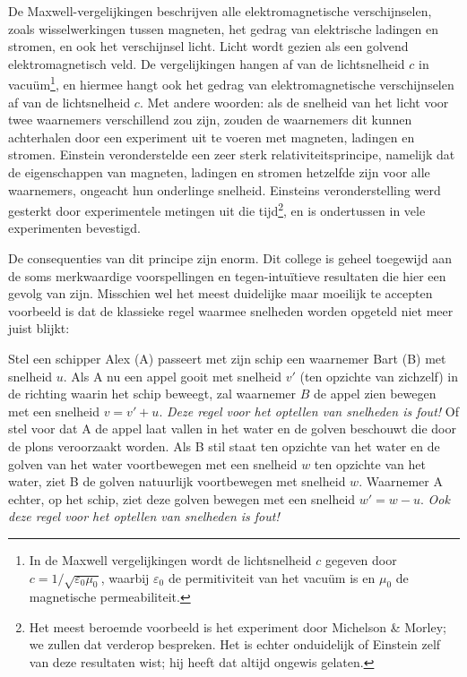 De Maxwell-vergelijkingen beschrijven alle elektromagnetische
verschijnselen, zoals wisselwerkingen tussen magneten, het gedrag van
elektrische ladingen en stromen, en ook het verschijnsel licht. Licht
wordt gezien als een golvend elektromagnetisch veld. De vergelijkingen
hangen af van de lichtsnelheid $c$ in vacu\"um\footnote{In de Maxwell
vergelijkingen wordt de lichtsnelheid $c$ gegeven door
$c=1/\sqrt{\varepsilon_0 \mu_0}$, waarbij $\varepsilon_0$ de
permitiviteit van het vacu\"um is en $\mu_0$ de magnetische
permeabiliteit.}, en hiermee hangt ook het gedrag van
elektromagnetische verschijnselen af van de lichtsnelheid $c$. Met
andere woorden: als de snelheid van het licht voor twee waarnemers
verschillend zou zijn, zouden de waarnemers dit kunnen achterhalen
door een experiment uit te voeren met magneten, ladingen en
stromen. Einstein veronderstelde een zeer sterk relativiteitsprincipe,
namelijk dat de eigenschappen van magneten, ladingen en stromen
hetzelfde zijn voor alle waarnemers, ongeacht hun onderlinge
snelheid. Einsteins veronderstelling werd gesterkt door experimentele
metingen uit die tijd\footnote{Het meest beroemde voorbeeld is het
experiment door Michelson \& Morley; we zullen dat verderop
bespreken. Het is echter onduidelijk of Einstein zelf van deze
resultaten wist; hij heeft dat altijd ongewis gelaten.}, en is
ondertussen in vele experimenten bevestigd.

De consequenties van dit principe zijn enorm. Dit college is geheel
toegewijd aan de soms merkwaardige voorspellingen en
tegen-intu\"itieve resultaten die hier een gevolg van zijn. Misschien
wel het meest duidelijke maar moeilijk te accepten voorbeeld is dat de
klassieke regel waarmee snelheden worden opgeteld niet meer juist
blijkt:

Stel een schipper Alex (A) passeert met zijn schip een waarnemer Bart
(B) met snelheid $u$. Als A nu een appel gooit met snelheid $v'$ (ten
opzichte van zichzelf) in de richting waarin het schip beweegt, zal
waarnemer $B$ de appel zien bewegen met een snelheid $v=v'+u$. {\it
Deze regel voor het optellen van snelheden is fout!} Of stel voor dat
A de appel laat vallen in het water en de golven beschouwt die door de
plons veroorzaakt worden. Als B stil staat ten opzichte van het water
en de golven van het water voortbewegen met een snelheid $w$ ten
opzichte van het water, ziet B de golven natuurlijk voortbewegen met
snelheid $w$. Waarnemer A echter, op het schip, ziet deze golven
bewegen met een snelheid $w'=w-u$. {\it Ook deze regel voor het
optellen van snelheden is fout!}

